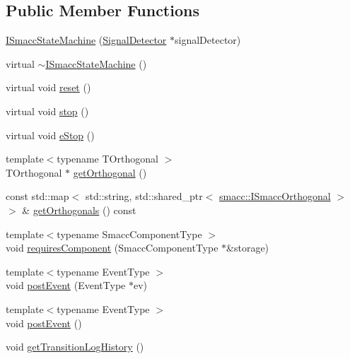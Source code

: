 \subsection*{Public Member Functions}
\begin{DoxyCompactItemize}
\item 
\hyperlink{classsmacc_1_1ISmaccStateMachine_a497c2185584adbec3298d4000277b75e}{I\+Smacc\+State\+Machine} (\hyperlink{classsmacc_1_1SignalDetector}{Signal\+Detector} $\ast$signal\+Detector)
\item 
virtual \hyperlink{classsmacc_1_1ISmaccStateMachine_a54bb9bac0008d3efc6a50cce88dce48e}{$\sim$\+I\+Smacc\+State\+Machine} ()
\item 
virtual void \hyperlink{classsmacc_1_1ISmaccStateMachine_a9e4b4fe4dda962642397993235c6eea0}{reset} ()
\item 
virtual void \hyperlink{classsmacc_1_1ISmaccStateMachine_adcb1b55e014f982a713a863ffb0261d3}{stop} ()
\item 
virtual void \hyperlink{classsmacc_1_1ISmaccStateMachine_a66a2900be8629748dab7a5c5ab6ae94e}{e\+Stop} ()
\item 
{\footnotesize template$<$typename T\+Orthogonal $>$ }\\T\+Orthogonal $\ast$ \hyperlink{classsmacc_1_1ISmaccStateMachine_a38b8b6e3d65b7de33020c9c397cf29bb}{get\+Orthogonal} ()
\item 
const std\+::map$<$ std\+::string, std\+::shared\+\_\+ptr$<$ \hyperlink{classsmacc_1_1ISmaccOrthogonal}{smacc\+::\+I\+Smacc\+Orthogonal} $>$ $>$ \& \hyperlink{classsmacc_1_1ISmaccStateMachine_a7f5b2882dbd077584767cb2533ed3c49}{get\+Orthogonals} () const
\item 
{\footnotesize template$<$typename Smacc\+Component\+Type $>$ }\\void \hyperlink{classsmacc_1_1ISmaccStateMachine_aa6b25e28f3bce24c4b356dc865a9eb7b}{requires\+Component} (Smacc\+Component\+Type $\ast$\&storage)
\item 
{\footnotesize template$<$typename Event\+Type $>$ }\\void \hyperlink{classsmacc_1_1ISmaccStateMachine_ad80cdd7bbc9a9f3b221c625754fed1ed}{post\+Event} (Event\+Type $\ast$ev)
\item 
{\footnotesize template$<$typename Event\+Type $>$ }\\void \hyperlink{classsmacc_1_1ISmaccStateMachine_a1549189caf29520514e677ca46f57348}{post\+Event} ()
\item 
void \hyperlink{classsmacc_1_1ISmaccStateMachine_ae7c08fc2addf8ee4785f721050e6a763}{get\+Transition\+Log\+History} ()

\end{DoxyCompactItemize}
